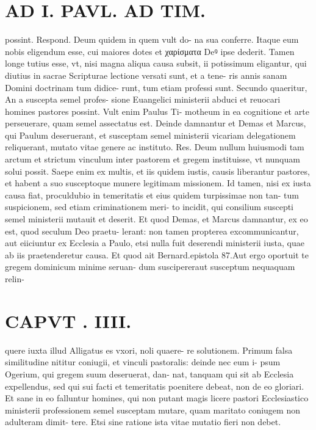 \documentclass{article}
\begin{document}
\begin{pages}
\section*{AD I. PAVL. AD TIM. }
\marginpar{[ p.202 ]}\pstart possint. Respond. Deum quidem in quem vult do- na sua conferre. Itaque eum nobis eligendum esse, cui maiores dotes et χαρίσματα Deꝰ ipse dederit. Tamen longe tutius esse, vt, nisi magna aliqua causa subsit, ii potissimum eligantur, qui diutius in sacrae Scripturae lectione versati sunt, et a tene- ris annis sanam Domini doctrinam tum didice- runt, tum etiam professi sunt. Secundo quaeritur, An a suscepta semel profes- sione Euangelici ministerii abduci et reuocari homines pastores possint. Vult enim Paulus Ti- motheum in ea cognitione et arte perseuerare, quam semel assectatus est. Deinde damnantur et Demas et Marcus, qui Paulum deseruerant, et susceptam semel ministerii vicariam delegationem reliquerant, mutato vitae genere ac instituto. Res. Deum nullum huiusmodi tam arctum et strictum vinculum inter pastorem et gregem instituisse, vt nunquam solui possit. Saepe enim ex multis, et iis quidem iustis, causis liberantur pastores, et habent a suo susceptoque munere legitimam missionem. Id tamen, nisi ex iusta causa fiat, proculdubio in temeritatis et eius quidem turpissimae non tan- tum suspicionem, sed etiam criminationem meri- to incidit, qui consilium suscepti semel ministerii mutauit et deserit. Et quod Demas, et Marcus damnantur, ex eo est, quod seculum Deo praetu- lerant: non tamen propterea excommunicantur, aut eiiciuntur ex Ecclesia a Paulo, etsi nulla fuit deserendi ministerii iusta, quae ab iis praetenderetur causa. Et quod ait Bernard.epistola 87.Aut ergo oportuit te gregem dominicum minime seruan- dum suscipereraut susceptum nequaquam relin-  \pend
\section*{CAPVT . IIII. }
\marginpar{[ p.293 ]}\pstart quere iuxta illud Alligatus es vxori, noli quaere- re solutionem. Primum falsa similitudine nititur coniugii, et vinculi pastoralis: deinde nec eum i- psum Ogerium, qui gregem suum deseruerat, dan- nat, tanquam qui sit ab Ecclesia expellendus, sed qui sui facti et temeritatis poenitere debeat, non de eo gloriari. Et sane in eo falluntur homines, qui non putant magis licere pastori Ecclesiastico ministerii professionem semel susceptam mutare, quam maritato coniugem non adulteram dimit- tere. Etsi sine ratione ista vitae mutatio fieri non debet.  \pend\pstart {}
{}

\end{pages}
\end{document}
